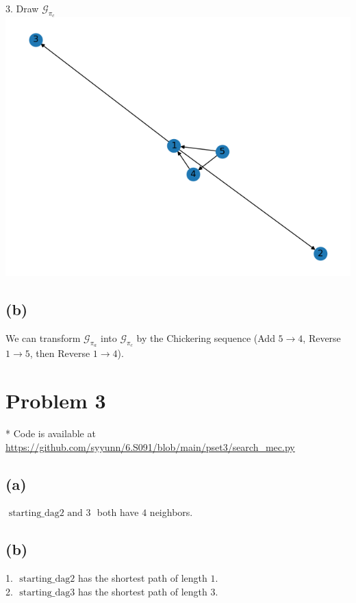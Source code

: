 \documentclass[10pt]{article}
\begin{document}
3. Draw $\mathcal{G}_{\pi_c}$\\

\includegraphics{images/pb1c.png}

\subsection{(b)}
We can transform  $\mathcal{G}_{\pi_a}$ into $\mathcal{G}_{\pi_c}$ by the Chickering sequence (Add $5 \rightarrow 4$, Reverse $1\rightarrow 5$, then Reverse $1\rightarrow 4$).

\section{Problem 3}
* Code is available at \url{https://github.com/syyunn/6.S091/blob/main/pset3/search_mec.py}

\subsection{(a)}
$\text { starting\_dag2 and 3 }$ both have $4$ neighbors. 
\subsection{(b)}
1. $\text { starting\_dag2}$ has the shortest path of length $1$.\\
2. $\text { starting\_dag3}$ has the shortest path of length $3$.
\end{document}
